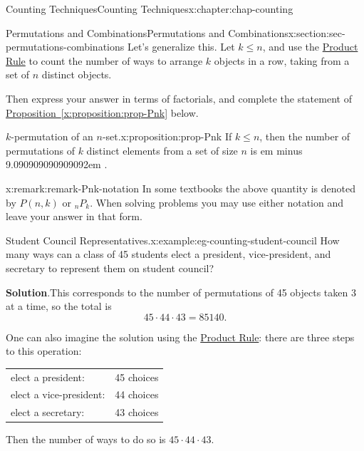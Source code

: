 \documentclass[oneside,10pt,]{book}
\newcommand{\blocktitlefont}{\relax}
\newcommand{\tabularfont}{\relax}
\newcommand{\xreffont}{\relax}
\newcommand{\fillin}[1]{\leavevmode\leaders\vrule height -1.2pt depth 1.5pt \hskip #1em minus #1em \null}
\numberwithin{equation}{section}
\begin{document}
\begin{chapterptx}{Counting Techniques}{}{Counting Techniques}{}{}{x:chapter:chap-counting}
\begin{sectionptx}{Permutations and Combinations}{}{Permutations and Combinations}{}{}{x:section:sec-permutations-combinations}
Let's generalize this. Let \(k \leq n\), and use the \hyperref[x:principle:prin-prod-rule]{Product Rule} to count the number of ways to arrange \(k\) objects in a row, taking from a set of \(n\) distinct objects.%
\par
Then express your answer in terms of factorials, and complete the statement of \hyperref[x:proposition:prop-Pnk]{Proposition~{\xreffont\ref{x:proposition:prop-Pnk}}} below.%
\begin{proposition}{\(k\)-permutation of an \(n\)-set.}{}{x:proposition:prop-Pnk}%
If \(k \leq n\), then the number of permutations of \(k\) distinct elements from a set of size \(n\) is \fillin{9.090909090909092}.%
\end{proposition}
\begin{remark}{}{x:remark:remark-Pnk-notation}%
In some textbooks the above quantity is denoted by \(P(n,k)\) or \(_nP_k\). When solving problems you may use either notation and leave your answer in that form.%
\end{remark}
\begin{example}{Student Council Representatives.}{x:example:eg-counting-student-council}%
How many ways can a class of 45 students elect a president, vice-president, and secretary to represent them on student council?%
\par\smallskip%
\noindent\textbf{\blocktitlefont Solution}.\hypertarget{g:solution:id325312}{}\quad{}This corresponds to the number of permutations of 45 objects taken 3 at a time, so the total is%
\begin{equation*}
45 \cdot 44 \cdot 43 = 85140\text{.}
\end{equation*}
%
\par
One can also imagine the solution using the \hyperref[x:principle:prin-prod-rule]{Product Rule}: there are three steps to this operation:%
\begin{sidebyside}{1}{0.15}{0.15}{0}%
\begin{sbspanel}{0.7}%
{\centering%
{\tabularfont%
\begin{tabular}{ll}
elect a president:&45 choices\tabularnewline[0pt]
elect a vice-president:&44 choices\tabularnewline[0pt]
elect a secretary:&43 choices
\end{tabular}
}%
\par}
\end{sbspanel}%
\end{sidebyside}%
\par
Then the number of ways to do so is \(45 \cdot 44 \cdot 43\).%
\end{example}

\end{sectionptx}
\end{chapterptx}
\end{document}
